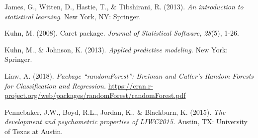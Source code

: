 \documentclass[acmart]{apa6}
\theoremstyle{definition}
\theoremstyle{definition}
\theoremstyle{definition}
\theoremstyle{remark}
\begin{document}
James, G., Witten, D., Hastie, T., \& Tibshirani, R. (2013). \emph{An
introduction to statistical learning}. New York, NY: Springer.

Kuhn, M. (2008). Caret package. \emph{Journal of Statistical Software,
28}(5), 1-26.

Kuhn, M., \& Johnson, K. (2013). \emph{Applied predictive modeling.} New
York: Springer.

Liaw, A. (2018). \emph{Package \enquote{randomForest}: Breiman and
Cutler's Random Forests for Classification and Regression.}
\url{https://cran.r-project.org/web/packages/randomForest/randomForest.pdf}

Pennebaker, J.W., Boyd, R.L., Jordan, K., \& Blackburn, K. (2015).
\emph{The development and psychometric properties of LIWC2015.} Austin,
TX: University of Texas at Austin.

\hypertarget{refs}{}

\endgroup
\end{document}
